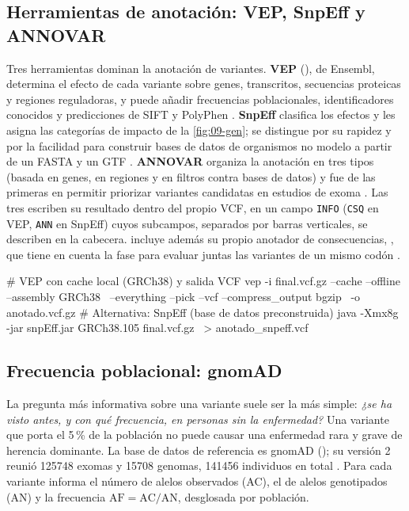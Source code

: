 \subsection{Herramientas de anotación: VEP, SnpEff y ANNOVAR}

Tres herramientas dominan la anotación de variantes. \textbf{VEP} (), de Ensembl, determina el efecto de cada variante sobre genes, transcritos, secuencias proteicas y regiones reguladoras, y puede añadir frecuencias poblacionales, identificadores conocidos y predicciones de SIFT y PolyPhen \parencite{c09-mclaren2016}. \textbf{SnpEff} clasifica los efectos y les asigna las categorías de impacto de la \cref{fig:09-gen}; se distingue por su rapidez y por la facilidad para construir bases de datos de organismos no modelo a partir de un FASTA y un GTF \parencite{c09-cingolani2012}. \textbf{ANNOVAR} organiza la anotación en tres tipos (basada en genes, en regiones y en filtros contra bases de datos) y fue de las primeras en permitir priorizar variantes candidatas en estudios de exoma \parencite{c09-wang2010}. Las tres escriben su resultado dentro del propio VCF, en un campo \texttt{INFO} (\texttt{CSQ} en VEP, \texttt{ANN} en SnpEff) cuyos subcampos, separados por barras verticales, se describen en la cabecera.  incluye además su propio anotador de consecuencias, , que tiene en cuenta la fase para evaluar juntas las variantes de un mismo codón \parencite{c09-danecek2021}.

\begin{consola}[anotar.sh]
# VEP con cache local (GRCh38) y salida VCF
vep -i final.vcf.gz --cache --offline --assembly GRCh38 \
    --everything --pick --vcf --compress_output bgzip \
    -o anotado.vcf.gz
# Alternativa: SnpEff (base de datos preconstruida)
java -Xmx8g -jar snpEff.jar GRCh38.105 final.vcf.gz \
    > anotado_snpeff.vcf
\end{consola}

\subsection{Frecuencia poblacional: gnomAD}

La pregunta más informativa sobre una variante suele ser la más simple: \emph{¿se ha visto antes, y con qué frecuencia, en personas sin la enfermedad?} Una variante que porta el 5\,\% de la población no puede causar una enfermedad rara y grave de herencia dominante. La base de datos de referencia es gnomAD (); su versión 2 reunió \num{125748} exomas y \num{15708} genomas, \num{141456} individuos en total \parencite{c09-karczewski2020}. Para cada variante informa el número de alelos observados (AC), el de alelos genotipados (AN) y la frecuencia $\mathrm{AF}=\mathrm{AC}/\mathrm{AN}$, desglosada por población.

